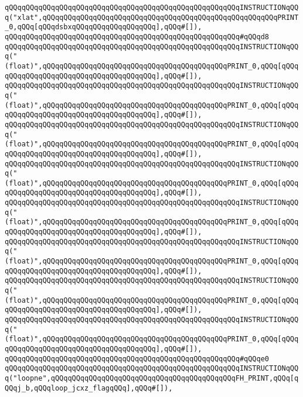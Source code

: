\verb|qQQqqQQqqQQqqQQqqQQqqQQqqQQqqQQqqQQqqQQqqQQqqQQqqQQqqQQqINSTRUCTIONqQQq("xlat",qQQqqQQqqQQqqQQqqQQqqQQqqQQqqQQqqQQqqQQqqQQqqQQqqQQqqQQqPRINT_0,qQQq[qQQqdsbxqQQqqQQqqQQqqQQqqQQq],qQQq#[]),|\newline
\verb|qQQqqQQqqQQqqQQqqQQqqQQqqQQqqQQqqQQqqQQqqQQqqQQqqQQqqQQq#qQQqd8|\newline
\verb|qQQqqQQqqQQqqQQqqQQqqQQqqQQqqQQqqQQqqQQqqQQqqQQqqQQqqQQqINSTRUCTIONqQQq("(float)",qQQqqQQqqQQqqQQqqQQqqQQqqQQqqQQqqQQqqQQqqQQqPRINT_0,qQQq[qQQqqQQqqQQqqQQqqQQqqQQqqQQqqQQqqQQqqQQq],qQQq#[]),|\newline
\verb|qQQqqQQqqQQqqQQqqQQqqQQqqQQqqQQqqQQqqQQqqQQqqQQqqQQqqQQqINSTRUCTIONqQQq("(float)",qQQqqQQqqQQqqQQqqQQqqQQqqQQqqQQqqQQqqQQqqQQqPRINT_0,qQQq[qQQqqQQqqQQqqQQqqQQqqQQqqQQqqQQqqQQqqQQq],qQQq#[]),|\newline
\verb|qQQqqQQqqQQqqQQqqQQqqQQqqQQqqQQqqQQqqQQqqQQqqQQqqQQqqQQqINSTRUCTIONqQQq("(float)",qQQqqQQqqQQqqQQqqQQqqQQqqQQqqQQqqQQqqQQqqQQqPRINT_0,qQQq[qQQqqQQqqQQqqQQqqQQqqQQqqQQqqQQqqQQqqQQq],qQQq#[]),|\newline
\verb|qQQqqQQqqQQqqQQqqQQqqQQqqQQqqQQqqQQqqQQqqQQqqQQqqQQqqQQqINSTRUCTIONqQQq("(float)",qQQqqQQqqQQqqQQqqQQqqQQqqQQqqQQqqQQqqQQqqQQqPRINT_0,qQQq[qQQqqQQqqQQqqQQqqQQqqQQqqQQqqQQqqQQqqQQq],qQQq#[]),|\newline
\verb|qQQqqQQqqQQqqQQqqQQqqQQqqQQqqQQqqQQqqQQqqQQqqQQqqQQqqQQqINSTRUCTIONqQQq("(float)",qQQqqQQqqQQqqQQqqQQqqQQqqQQqqQQqqQQqqQQqqQQqPRINT_0,qQQq[qQQqqQQqqQQqqQQqqQQqqQQqqQQqqQQqqQQqqQQq],qQQq#[]),|\newline
\verb|qQQqqQQqqQQqqQQqqQQqqQQqqQQqqQQqqQQqqQQqqQQqqQQqqQQqqQQqINSTRUCTIONqQQq("(float)",qQQqqQQqqQQqqQQqqQQqqQQqqQQqqQQqqQQqqQQqqQQqPRINT_0,qQQq[qQQqqQQqqQQqqQQqqQQqqQQqqQQqqQQqqQQqqQQq],qQQq#[]),|\newline
\verb|qQQqqQQqqQQqqQQqqQQqqQQqqQQqqQQqqQQqqQQqqQQqqQQqqQQqqQQqINSTRUCTIONqQQq("(float)",qQQqqQQqqQQqqQQqqQQqqQQqqQQqqQQqqQQqqQQqqQQqPRINT_0,qQQq[qQQqqQQqqQQqqQQqqQQqqQQqqQQqqQQqqQQqqQQq],qQQq#[]),|\newline
\verb|qQQqqQQqqQQqqQQqqQQqqQQqqQQqqQQqqQQqqQQqqQQqqQQqqQQqqQQqINSTRUCTIONqQQq("(float)",qQQqqQQqqQQqqQQqqQQqqQQqqQQqqQQqqQQqqQQqqQQqPRINT_0,qQQq[qQQqqQQqqQQqqQQqqQQqqQQqqQQqqQQqqQQqqQQq],qQQq#[]),|\newline
\verb|qQQqqQQqqQQqqQQqqQQqqQQqqQQqqQQqqQQqqQQqqQQqqQQqqQQqqQQq#qQQqe0|\newline
\verb|qQQqqQQqqQQqqQQqqQQqqQQqqQQqqQQqqQQqqQQqqQQqqQQqqQQqqQQqINSTRUCTIONqQQq("loopne",qQQqqQQqqQQqqQQqqQQqqQQqqQQqqQQqqQQqqQQqqQQqFH_PRINT,qQQq[qQQqj_b,qQQqloop_jcxz_flagqQQq],qQQq#[]),|\newline
